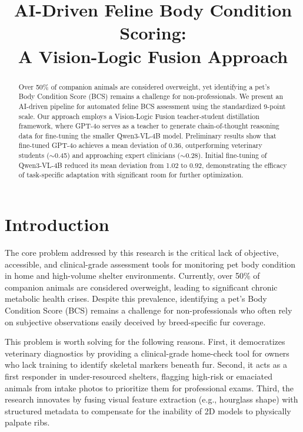 \documentclass[11pt,twocolumn]{article}
\title{AI-Driven Feline Body Condition Scoring:\\A Vision-Logic Fusion Approach}
\begin{document}
\maketitle

\begin{abstract}
Over 50\% of companion animals are considered overweight, yet identifying a pet's Body Condition Score (BCS) remains a challenge for non-professionals. We present an AI-driven pipeline for automated feline BCS assessment using the standardized 9-point scale. Our approach employs a Vision-Logic Fusion teacher-student distillation framework, where GPT-4o serves as a teacher to generate chain-of-thought reasoning data for fine-tuning the smaller Qwen3-VL-4B model. Preliminary results show that fine-tuned GPT-4o achieves a mean deviation of 0.36, outperforming veterinary students ($\sim$0.45) and approaching expert clinicians ($\sim$0.28). Initial fine-tuning of Qwen3-VL-4B reduced its mean deviation from 1.02 to 0.92, demonstrating the efficacy of task-specific adaptation with significant room for further optimization.
\end{abstract}

\section{Introduction}

The core problem addressed by this research is the critical lack of objective, accessible, and clinical-grade assessment tools for monitoring pet body condition in home and high-volume shelter environments. Currently, over 50\% of companion animals are considered overweight, leading to significant chronic metabolic health crises. Despite this prevalence, identifying a pet's Body Condition Score (BCS) remains a challenge for non-professionals who often rely on subjective observations easily deceived by breed-specific fur coverage.

This problem is worth solving for the following reasons. First, it democratizes veterinary diagnostics by providing a clinical-grade home-check tool for owners who lack training to identify skeletal markers beneath fur. Second, it acts as a first responder in under-resourced shelters, flagging high-risk or emaciated animals from intake photos to prioritize them for professional exams. Third, the research innovates by fusing visual feature extraction (e.g., hourglass shape) with structured metadata to compensate for the inability of 2D models to physically palpate ribs.
\end{document}

